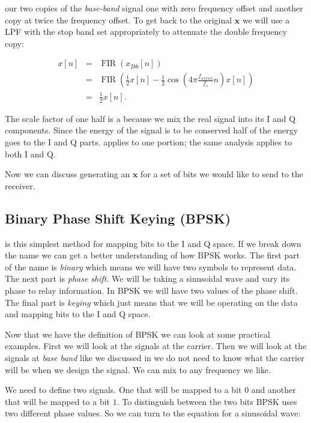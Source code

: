 our two copies of the \emph{base-band} signal one with zero frequency offset and another copy at twice the frequency offset. To get back to the original $\mathbf{x}$ we will use a \ac{LPF} with the stop band set appropriately to attenuate the double frequency copy:

\begin{eqnarray}
\label{eq:fir}
x[n] &=& \operatorname{FIR}(x_{2bb}[n])\\
&=& \operatorname{FIR}\left(\frac{1}{2}x[n] - \frac{1}{2}\cos\left(4\pi\frac{f_{offset}}{f_s}n\right)x[n]\right)\\
&=& \frac{1}{2}x[n].
\end{eqnarray}

The scale factor of one half is a because we mix the real signal into its \ac{I} and \ac{Q} components. Since the energy of the signal is to be conserved half of the energy goes to the \ac{I} and \ac{Q} parts.  applies to one portion; the same analysis applies to both \ac{I} and \ac{Q}.

Now we can discuss generating an $\mathbf{x}$ for a set of bits we would like to send to the receiver. 
	
\subsection{Binary Phase Shift Keying (BPSK)}

 is this simplest method for mapping bits to the \ac{I} and \ac{Q} space. If we break down the name we can get a better understanding of how \ac{BPSK} works. The first part of the name is \emph{binary} which means we will have two symbols to represent data. The next part is \emph{phase shift}. We will be taking a sinusoidal wave and vary its phase to relay information. In \ac{BPSK} we will have two values of the phase shift. The final part is \emph{keying} which just means that we will be operating on the data and mapping bits to the \ac{I} and \ac{Q} space.

Now that we have the definition of \ac{BPSK} we can look at some practical examples. First we will look at the signals at the carrier. Then we will look at the signals at \emph{base band} like we discussed in  we do not need to know what the carrier will be when we design the signal. We can mix to any frequency we like.

We need to define two signals. One that will be mapped to a bit $0$ and another that will be mapped to a bit $1$. To distinguish between the two bits \ac{BPSK} uses two different phase values. So we can turn to the equation for a sinusoidal wave:

